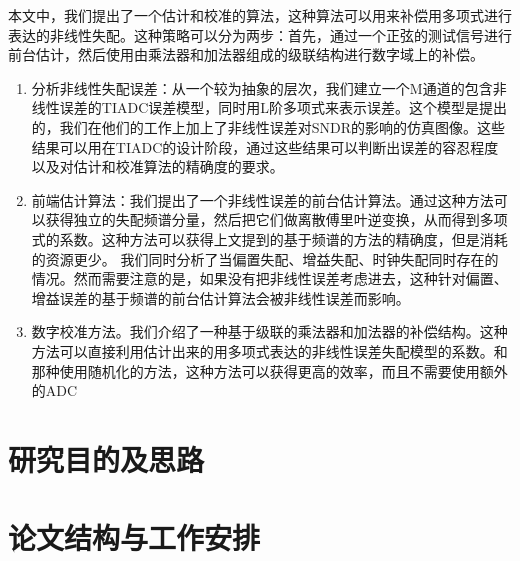 	本文中，我们提出了一个估计和校准的算法，这种算法可以用来补偿用多项式进行表达的非线性失配。这种策略可以分为两步：首先，通过一个正弦的测试信号进行前台估计，然后使用由乘法器和加法器组成的级联结构进行数字域上的补偿。
	\begin{enumerate}
		\item 分析非线性失配误差：从一个较为抽象的层次，我们建立一个M通道的包含非线性误差的TIADC误差模型，同时用L阶多项式来表示误差。这个模型是提出的，我们在他们的工作上加上了非线性误差对SNDR的影响的仿真图像。这些结果可以用在TIADC的设计阶段，通过这些结果可以判断出误差的容忍程度以及对估计和校准算法的精确度的要求。
		\item 前端估计算法：我们提出了一个非线性误差的前台估计算法。通过这种方法可以获得独立的失配频谱分量，然后把它们做离散傅里叶逆变换，从而得到多项式的系数。这种方法可以获得上文提到的基于频谱的方法的精确度，但是消耗的资源更少。
		我们同时分析了当偏置失配、增益失配、时钟失配同时存在的情况。然而需要注意的是，如果没有把非线性误差考虑进去，这种针对偏置、增益误差的基于频谱的前台估计算法会被非线性误差而影响。
		\item 数字校准方法。我们介绍了一种基于级联的乘法器和加法器的补偿结构。这种方法可以直接利用估计出来的用多项式表达的非线性误差失配模型的系数。和那种使用随机化的方法，这种方法可以获得更高的效率，而且不需要使用额外的ADC
	\end {enumerate}
	
	
	
\section {研究目的及思路}
\section {论文结构与工作安排}


